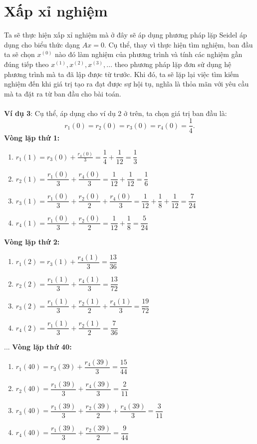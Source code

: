 \section{Xấp xỉ nghiệm}
 Ta sẽ thực hiện xấp xỉ nghiệm mà ở đây sẽ áp dụng phương pháp lặp Seidel áp dụng cho biểu thức dạng $Ax=0$. Cụ thể, thay vì thực hiện tìm nghiệm, ban đầu ta sẽ chọn $x^{(0)}$ nào đó làm nghiệm của phương trình và tính các nghiệm gần đúng tiếp theo $x^{(1)}, x^{(2)}, x^{(3)}, ...$ theo phương pháp lặp đơn sử dụng hệ phương trình mà ta đã lập được từ trước. Khi đó, ta sẽ lặp lại việc tìm kiếm nghiệm đến khi giá trị tạo ra đạt được sự hội tụ, nghĩa là thỏa mãn với yêu cầu mà ta đặt ra từ ban đầu cho bài toán.\\\\
\textbf{Ví dụ 3}: Cụ thể, áp dụng cho ví dụ 2 ở trên, ta chọn giá trị ban đầu là:\\
$$r_1(0)=r_2(0)=r_3(0)=r_4(0)=\displaystyle\frac{1}{4}.$$
\textbf{Vòng lặp thứ 1:}
\begin{enumerate}
    \item $r_1(1) = r_3(0) + \displaystyle\frac{r_4(0)}{3} = \dfrac{1}{4} + \dfrac{1}{12} = \dfrac{1}{3}$
    \item $r_2(1) = \dfrac{r_1(0)}{3} + \dfrac{r_4(0)}{3} = \dfrac{1}{12} + \dfrac{1}{12} = \dfrac{1}{6}$
    \item $r_3(1) = \dfrac{r_1(0)}{3} + \dfrac{r_2(0)}{2} + \dfrac{r_4(0)}{3} = \dfrac{1}{12} + \dfrac{1}{8} + \dfrac{1}{12} = \dfrac{7}{24}$
    \item $r_4(1) = \dfrac{r_1(0)}{3} + \dfrac{r_2(0)}{2} = \dfrac{1}{12} + \dfrac{1}{8} = \dfrac{5}{24}$
\end{enumerate}
\textbf{Vòng lặp thứ 2:}
\begin{enumerate}
    \item $r_1(2) = r_3(1) + \dfrac{r_4(1)}{3} = \dfrac{13}{36}$
    \item $r_2(2) = \dfrac{r_1(1)}{3} + \dfrac{r_4(1)}{3} = \dfrac{13}{72}$
    \item $r_3(2) = \dfrac{r_1(1)}{3} + \dfrac{r_2(1)}{2} + \dfrac{r_4(1)}{3} = \dfrac{19}{72}$
    \item $r_4(2) = \dfrac{r_1(1)}{3} + \dfrac{r_2(1)}{2}  = \dfrac{7}{36}$
\end{enumerate}
...\newline
\textbf{Vòng lặp thứ 40:}
\begin{enumerate}
    \item $r_1(40) = r_3(39) + \dfrac{r_4(39)}{3} = \dfrac{15}{44}$
    \item $r_2(40) = \dfrac{r_1(39)}{3} + \dfrac{r_4(39)}{3} = \dfrac{2}{11}$
    \item $r_3(40) = \dfrac{r_1(39)}{3} + \dfrac{r_2(39)}{2} + \dfrac{r_4(39)}{3} = \dfrac{3}{11}$
    \item $r_4(40) = \dfrac{r_1(39)}{3} + \dfrac{r_2(39)}{2}  = \dfrac{9}{44}$
\end{enumerate}

